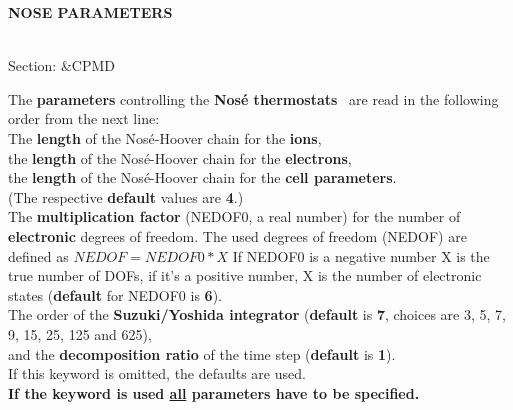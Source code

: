 \documentclass[twoside,10pt,titlepage,a4paper]{article}
\newcommand{\reflabel}[1]{\hypertarget{#1}}
\newcommand{\reflabel}[1]{\label{#1}}
\newcommand{\keyword}[5]{%
\vspace{1.0cm}
\begin{minipage}{15cm}
\reflabel{#1}{\textbf{\large #1}}%
\index{#1}%
\ \textbf{#2}%
\ \textbf{#3}%
\ \textit{#4}%
     \hfill\\\smallskip
     {Section: #5}
     \hfill\\\smallskip\vskip 10pt
\end{minipage}
}%
\newcommand{\desc}[1]{%
   \hspace*{\fill} \parbox{130mm}{\sloppy
                          {#1}%
                             }
     \hfill\\\smallskip
   }%
\newcommand{\desc}[1]{#1\vspace{1ex}}
\begin{document}
\keyword{NOSE PARAMETERS}{}{}{}{\&CPMD}
  \desc{The {\bf parameters} controlling the {\bf Nos\'e
      thermostats}~\cite{Nose84,Hoover85} are read in the following order 
      from the next line:\\
      The {\bf length} of the Nos\'e-Hoover chain for the {\bf ions},\\
      the {\bf length} of the Nos\'e-Hoover chain for the {\bf electrons},\\
      the {\bf length} of the Nos\'e-Hoover chain for the {\bf cell
      parameters}.\\
      (The respective {\bf default} values are {\bf 4}.)\\
      The {\bf multiplication factor} (NEDOF0, a real number) for the number of
      {\bf electronic} degrees of freedom.
      The used degrees of freedom (NEDOF) are defined as $NEDOF=NEDOF0*X$
      If NEDOF0 is a negative number X is the true number of DOFs, if
      it's a positive number, X is the number of electronic states
      ({\bf default} for NEDOF0 is {\bf 6}).
      \\
      The order of the {\bf Suzuki/Yoshida integrator}
      ({\bf default} is {\bf 7}, choices are 3, 5, 7, 9, 15, 25, 125 and 625),\\
      and the {\bf decomposition ratio} of the time step
      ({\bf default} is {\bf 1}).\\
      If this keyword is omitted, the defaults are used. \\
      {\bf If the keyword is used \underline{all} parameters have to be
      specified.}}
\end{document}
